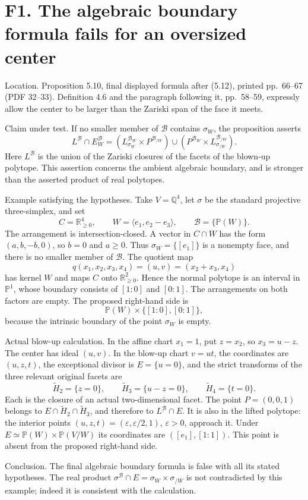 \documentclass[10pt]{article}
\begin{document}
\section*{F1. The algebraic boundary formula fails for an oversized center}
Location. Proposition 5.10, final displayed formula after (5.12), printed pp. 66–67 (PDF 32–33). Definition 4.6 and the paragraph following it, pp. 58–59, expressly allow the center to be larger than the Zariski span of the face it meets.\par
Claim under test. If no smaller member of \(\mathcal B\) contains \(\sigma_W\), the proposition asserts \[L^\mathcal B\cap E_W^\mathcal B
 =(L_{\sigma_W}^{\mathcal B_W}\times P^{\mathcal B_{/W}})
 \cup(P^{\mathcal B_W}\times L_{\sigma_{/W}}^{\mathcal B_{/W}}).\] Here \(L^\mathcal B\) is the union of the Zariski closures of the facets of the blown-up polytope. This assertion concerns the ambient algebraic boundary, and is stronger than the asserted product of real polytopes.\par
Example satisfying the hypotheses. Take \(V=\mathbb Q^4\), let \(\sigma\) be the standard projective three-simplex, and set \[C=\mathbb R_{\geq0}^4,\qquad
 W=\langle e_1,e_2-e_3\rangle,\qquad \mathcal B=\{\mathbb P(W)\}.\] The arrangement is intersection-closed. A vector in \(C\cap W\) has the form \((a,b,-b,0)\), so \(b=0\) and \(a\geq0\). Thus \(\sigma_W=\{[e_1]\}\) is a nonempty face, and there is no smaller member of \(\mathcal B\). The quotient map \[q(x_1,x_2,x_3,x_4)=(u,v)=(x_2+x_3,x_4)\] has kernel \(W\) and maps \(C\) onto \(\mathbb R_{\geq0}^2\). Hence the normal polytope is an interval in \(\mathbb P^1\), whose boundary consists of \([1:0]\) and \([0:1]\). The arrangements on both factors are empty. The proposed right-hand side is \[\mathbb P(W)\times\{[1:0],[0:1]\},\] because the intrinsic boundary of the point \(\sigma_W\) is empty.\par
Actual blow-up calculation. In the affine chart \(x_1=1\), put \(z=x_2\), so \(x_3=u-z\). The center has ideal \((u,v)\). In the blow-up chart \(v=ut\), the coordinates are \((u,z,t)\), the exceptional divisor is \(E=\{u=0\}\), and the strict transforms of the three relevant original facets are \[\widetilde H_2=\{z=0\},\qquad
 \widetilde H_3=\{u-z=0\},\qquad
 \widetilde H_4=\{t=0\}.\] Each is the closure of an actual two-dimensional facet. The point \(P=(0,0,1)\) belongs to \(E\cap\widetilde H_2\cap\widetilde H_3\), and therefore to \(L^\mathcal B\cap E\). It is also in the lifted polytope: the interior points \((u,z,t)=(\varepsilon,\varepsilon/2,1)\), \(\varepsilon>0\), approach it. Under \(E\simeq\mathbb P(W)\times\mathbb P(V/W)\) its coordinates are \(([e_1],[1:1])\). This point is absent from the proposed right-hand side.\par
Conclusion. The final algebraic boundary formula is false with all its stated hypotheses. The real product \(\sigma^\mathcal B\cap E=\sigma_W\times\sigma_{/W}\) is not contradicted by this example; indeed it is consistent with the calculation.\par
\end{document}
